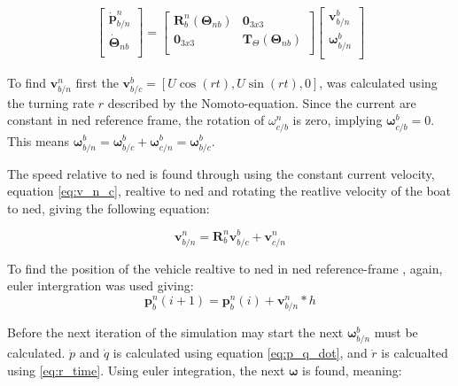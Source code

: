 \begin{equation}
    \begin{aligned}
    \begin{bmatrix}
    \dot{\mathbf{p}}^n_{b/n} \\
    \dot{\boldsymbol{\Theta}}_{nb} \\
    \end{bmatrix}
    =
    \begin{bmatrix}
    \mathbf{R}^n_{b}(\boldsymbol{\Theta}_{nb}) & \mathbf{0}_{3x3} \\
    \mathbf{0}_{3x3} & \mathbf{T}_\Theta (\boldsymbol{\Theta}_{nb})  \\
    \end{bmatrix}
    \begin{bmatrix}
    \mathbf{v}^b_{b/n} \\
    \mathbf{\omega}^b_{b/n} \\
    \end{bmatrix}
    \end{aligned}
\end{equation}

To find $\mathbf{v}^n_{b/n}$ first the $\mathbf{v}^b_{b/c} = [U \cos(rt), U \sin(r t),0]$, was calculated using the turning rate $r$ described by the Nomoto-equation. Since the current are constant in ned reference frame, the rotation of $\omega^n_{c/b} $ is zero, implying $\boldsymbol{\omega}^b_{c/b} = 0$. This means $ \boldsymbol{\omega}^b_{b/n} = \boldsymbol{\omega}^b_{b/c} + \boldsymbol{\omega}^b_{c/n}  = \boldsymbol{\omega}^b_{b/c} $. 

The speed relative to ned is  found  through using the constant current velocity, equation \eqref{eq:v_n_c}, realtive to ned and rotating the reatlive velocity of the boat to ned, giving the following equation:

\begin{equation}
    \mathbf{v}^n_{b/n} = \mathbf{R}^n_{b} \mathbf{v}^b_{b/c} + \mathbf{v}^n_{c/n}
\end{equation}

To find the position of the vehicle realtive to ned in ned reference-frame , again, euler intergration was used giving:
\begin{equation}
    \mathbf{p}^n_b(i+1) = \mathbf{p}^n_b(i) + \mathbf{v}^n_{b/n} * h
\end{equation}

Before the next iteration of the simulation may start the next $\boldsymbol{\omega}^b_{b/n}$ must be calculated. $\dot{p}$ and $\dot{q}$ is calculated using equation \eqref{eq:p_q_dot}, and $\dot{r}$ is calcualted using \eqref{eq:r_time}. Using euler integration, the next $\boldsymbol{\omega}$ is found, meaning:

